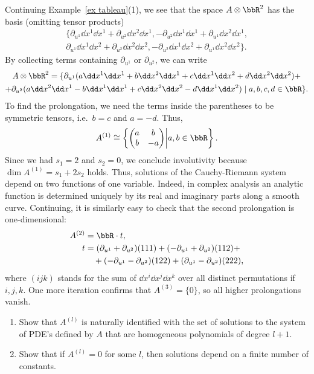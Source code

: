 \begin{example}
    Continuing Example~\ref{ex tableau}(1), we see that the space $A\otimes \bbR^2$ has the basis (omitting tensor products)
    \begin{multline}
        \{\partial_{u^1}\dd x^1\dd x^1+\partial_{u^2}\dd x^2\dd x^1,-\partial_{u^2}\dd x^1\dd x^1+\partial_{u^1}\dd x^2\dd x^1,\\
        \partial_{u^1}\dd x^1\dd x^2+\partial_{u^2}\dd x^2\dd x^2, -\partial_{u^2}\dd x^1\dd x^2+\partial_{u^1}\dd x^2\dd x^2\}.
    \end{multline}
    By collecting terms containing $\partial_{u^1}$ or $\partial_{u^2}$, we can write 
    \begin{multline}
        A\otimes\bbR^2=\{\partial_{u^1}(a\dd x^1\dd x^1+b \dd x^2\dd x^1+c\dd x^1\dd x^2+d\dd x^2\dd x^2)+\\
        +\partial_{u^2}(a\dd x^2\dd x^1-b \dd x^1\dd x^1+c\dd x^2\dd x^2-d\dd x^1\dd x^2)\mid a,b,c,d\in\bbR\}.
    \end{multline}
    To find the prolongation, we need the terms inside the parentheses to be symmetric tensors, i.e.\ $b=c$ and $a=-d$. Thus,
    \[A^{(1)}\cong \left\{
        \begin{pmatrix}
            a&b\\b&-a
        \end{pmatrix}\middle| a,b\in\bbR
    \right\}.\]
    Since we had $s_1=2$ and $s_2=0$, we conclude involutivity because $\dim A^{(1)}=s_1+2s_2$ holds. Thus, solutions of the Cauchy-Riemann system depend on two functions of one variable. Indeed, in complex analysis an analytic function is determined uniquely by its real and imaginary parts along a smooth curve. Continuing, it is similarly easy to check that the second prolongation is one-dimensional:
    \begin{align}
        A^{(2)}&=\bbR\cdot t,\\
        t&=(\partial_{u^1}+\partial_{u^2})(111)+(-\partial_{u^1}+\partial_{u^2})(112)+\\
        &\quad +(-\partial_{u^1}-\partial_{u^2})(122)+(\partial_{u^1}-\partial_{u^2})(222),
    \end{align}
    where $(ijk)$ stands for the sum of $\dd x^i\dd x^j\dd x^k$ over all distinct permutations if $i,j,k$. One more iteration confirms that $A^{(3)}=\{0\}$, so all higher prolongations vanish.
\end{example}


\begin{xca}
    \begin{enumerate}
        \item Show that $A^{(l)}$ is naturally identified with the set of solutions to the system of PDE's defined by $A$ that are homogeneous polynomials of degree $l+1$.
        \item Show that if $A^{(l)}=0$ for some $l$, then solutions depend on a finite number of constants.
    \end{enumerate}
\end{xca}

